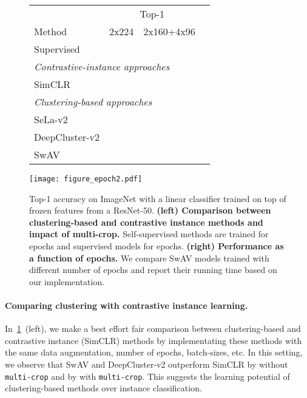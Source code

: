 \documentclass{article}
\def\OURS{SwAV\xspace}
\begin{document}
\begin{figure}[t]
  \begin{minipage}{0.5\linewidth}
    \begin{tabular}{ @{} l c c c  @{}}
      \toprule
                    & \multicolumn{2}{c}{Top-1} &  \\
                    \cmidrule{2-3}
      Method        & 2x224 & 2x160+4x96 &  \\
      \midrule
      Supervised    &  &  & \\
      \midrule
  \multicolumn{4}{l}{\textit{Contrastive-instance approaches}}\\
      SimCLR        &  &  & \\
      \midrule
  \multicolumn{4}{l}{\textit{Clustering-based approaches}}\\
      SeLa-v2        &  &  & \\
      DeepCluster-v2 &  &  & \\
      \OURS         &  &  & \\
      \bottomrule
    \end{tabular}
  \end{minipage}
  \begin{minipage}{0.5\linewidth}
    \centering
    \texttt{[image: figure\_epoch2.pdf]}
  \end{minipage}
  \vspace{-0.3em}
  \caption{
    Top-1 accuracy on ImageNet with a linear classifier trained on top of frozen features from a ResNet-50.
    \textbf{(left) Comparison between clustering-based and contrastive instance methods and impact of multi-crop.} 
Self-supervised methods are trained for  epochs and supervised models for  epochs.
\textbf{(right) Performance as a function of epochs.}
    We compare \OURS models trained with different number of epochs and report their running time based on our implementation.
  }
  \label{fig:multicrop-exp}
\end{figure}

\paragraph{Comparing clustering with contrastive instance learning.}
In~\cref{fig:multicrop-exp}~(left), we make a best effort fair comparison between clustering-based and contrastive instance (SimCLR) methods by implementating these methods with the same data augmentation, number of epochs, batch-sizes, etc.
In this setting, we observe that \OURS and DeepCluster-v2 outperform SimCLR by  without \texttt{multi-crop} and by  with \texttt{multi-crop}.
This suggests the learning potential of clustering-based methods over instance classification.
\end{document}
